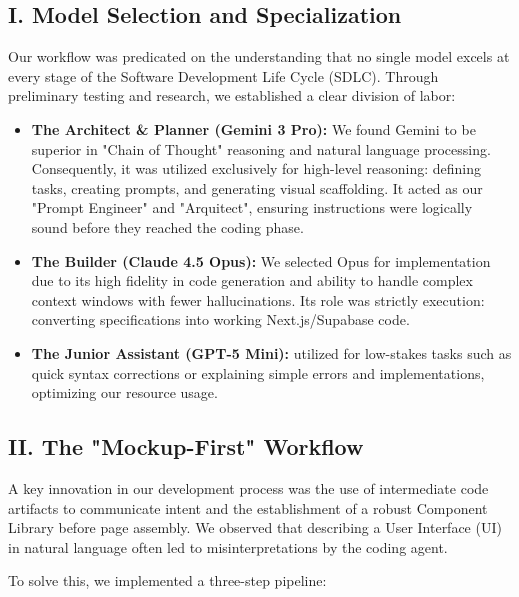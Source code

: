 \documentclass[a4paper,12pt]{report}
\begin{document}
\subsection*{I. Model Selection and Specialization}

Our workflow was predicated on the understanding that no single model excels at every stage of the Software Development Life Cycle (SDLC). Through preliminary testing and research, we established a clear division of labor:

\begin{itemize}
    \item \textbf{The Architect \& Planner (Gemini 3 Pro):} We found Gemini to be superior in "Chain of Thought" reasoning and natural language processing. Consequently, it was utilized exclusively for high-level reasoning: defining tasks, creating prompts, and generating visual scaffolding. It acted as our "Prompt Engineer" and "Arquitect", ensuring instructions were logically sound before they reached the coding phase.
    \item \textbf{The Builder (Claude 4.5 Opus):} We selected Opus for implementation due to its high fidelity in code generation and ability to handle complex context windows with fewer hallucinations. Its role was strictly execution: converting specifications into working Next.js/Supabase code.
    \item \textbf{The Junior Assistant (GPT-5 Mini):} utilized for low-stakes tasks such as quick syntax corrections or explaining simple errors and implementations, optimizing our resource usage.
\end{itemize}

\subsection*{II. The "Mockup-First" Workflow}
A key innovation in our development process was the use of intermediate code artifacts to communicate intent and the establishment of a robust Component Library before page assembly. We observed that describing a User Interface (UI) in natural language often led to misinterpretations by the coding agent.

To solve this, we implemented a three-step pipeline:
\end{document}
